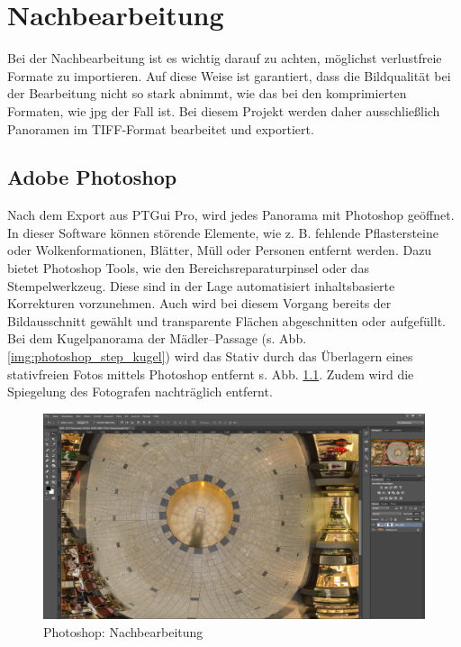 \documentclass[liststotoc,bibtotoc,fontsize=14pt,]{scrreprt}
\begin{document}
	\chapter{Nachbearbeitung}
	\label{ch:nach}
	Bei der Nachbearbeitung ist es wichtig darauf zu achten, möglichst verlustfreie Formate zu importieren. Auf diese Weise ist garantiert, dass die Bildqualität bei der Bearbeitung nicht so stark abnimmt, wie das bei den komprimierten Formaten, wie jpg der Fall ist. Bei diesem Projekt werden daher ausschließlich Panoramen im TIFF-Format bearbeitet und exportiert.
	
	\section{Adobe Photoshop}
	\label{sec:photo}
	Nach dem Export aus PTGui Pro, wird jedes Panorama mit Photoshop geöffnet. In dieser Software können störende Elemente, wie z. B. fehlende Pflastersteine oder Wolkenformationen, Blätter, Müll oder Personen entfernt werden. Dazu bietet Photoshop Tools, wie den Bereichsreparaturpinsel oder das Stempelwerkzeug. Diese sind in der Lage automatisiert inhaltsbasierte Korrekturen vorzunehmen. Auch wird bei diesem Vorgang bereits der Bildausschnitt gewählt und transparente Flächen abgeschnitten oder aufgefüllt.
	\bigskip
	Bei dem Kugelpanorama der Mädler--Passage (s. Abb. \ref{img:photoshop_step_kugel}) wird das Stativ durch das Überlagern eines stativfreien Fotos mittels Photoshop entfernt s. Abb. \ref{img:photoshop_bearbeitung}. Zudem wird die Spiegelung des Fotografen nachträglich entfernt.  
	
	\begin{figure}[H]
		\includegraphics[width=\linewidth]{img/steps/PS_Kugel_Edit.PNG}
		\caption{Photoshop: Nachbearbeitung}
		\label{img:photoshop_bearbeitung}
	\end{figure}
	
\end{document}
